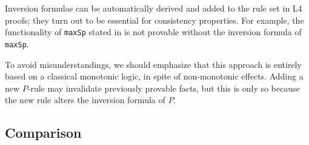 Inversion formulas can be automatically derived and added to the rule set in
L4 proofs; they turn out to be essential for consistency properties. For
example, the functionality of \texttt{maxSp} stated in 
is not provable without the inversion formula of \texttt{maxSp}.

To avoid misunderstandings, we should emphasize that this approach is entirely
based on a classical monotonic logic, in spite of non-monotonic
effects. Adding a new $P$-rule may invalidate previously provable facts, but
this is only so because the new rule alters the inversion formula of $P$.



\subsection{Comparison}\label{sec:comparison}





